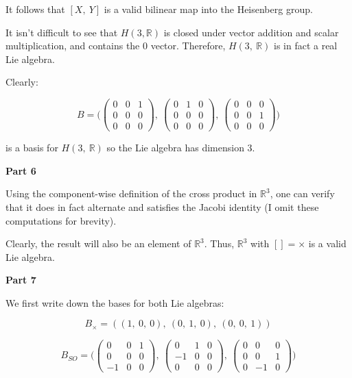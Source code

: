 \documentclass[10pt, oneside]{article}
\begin{document}
    It follows that $[X, \ Y]$ is a valid bilinear map into the Heisenberg group.
    \newline

    It isn't difficult to see that $H(3, \mathbb{R})$ is closed under vector addition and scalar multiplication, and contains the $0$ vector. Therefore, $H(3, \ \mathbb{R})$ is
    in fact a real Lie algebra.
    \newline

    Clearly:

    $$B = \Big( \begin{pmatrix} 0 & 0 & 1 \\ 0 & 0 & 0 \\ 0 & 0 & 0 \end{pmatrix}, \ \begin{pmatrix} 0 & 1 & 0 \\ 0 & 0 & 0 \\ 0 & 0 & 0 \end{pmatrix}, \ \begin{pmatrix} 0 & 0 & 0 \\ 0 & 0 & 1 \\ 0 & 0 & 0 \end{pmatrix} \Big)$$

    is a basis for $H(3, \ \mathbb{R})$ so the Lie algebra has dimension $3$.
    \newline

    \textbf{Part 6}
    \newline

    Using the component-wise definition of the cross product in $\mathbb{R}^3$, one can verify that it does in fact alternate and satisfies the Jacobi identity (I omit these computations for brevity).
    \newline

    Clearly, the
    result will also be an element of $\mathbb{R}^3$. Thus, $\mathbb{R}^3$ with $[] = \times$ is a valid Lie algebra.
    \newline

    \textbf{Part 7}
    \newline

    We first write down the bases for both Lie algebras:

    $$B_{\times} = ((1, \ 0, \ 0), \ (0, \ 1, \ 0), \ (0, \ 0, \ 1))$$

    $$B_{SO} = \Big( \begin{pmatrix} 0 & 0 & 1 \\ 0 & 0 & 0 \\ -1 & 0 & 0 \end{pmatrix}, \ \begin{pmatrix} 0 & 1 & 0 \\ -1 & 0 & 0 \\ 0 & 0 & 0 \end{pmatrix}, \ \begin{pmatrix} 0 & 0 & 0 \\ 0 & 0 & 1 \\ 0 & -1 & 0 \end{pmatrix} \Big)$$
\end{document}

